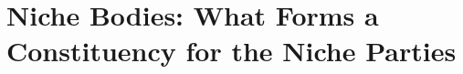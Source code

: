 \section{Niche Bodies: What Forms a Constituency for the Niche Parties}\label{sec:Niche Bodies}
%
%
